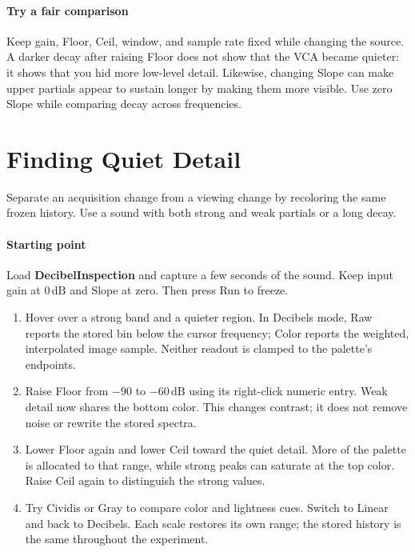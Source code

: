 \paragraph{Try a fair comparison}
Keep gain, Floor, Ceil, window, and sample rate fixed while changing the
source. A darker decay after raising Floor does not show that the VCA became
quieter: it shows that you hid more low-level detail. Likewise, changing
Slope can make upper partials appear to sustain longer by making them more
visible. Use zero Slope while comparing decay across frequencies.

\clearpage
\section{Finding Quiet Detail}\label{sec:detail}

Separate an acquisition change from a viewing change by recoloring the same
frozen history. Use a sound with both strong and weak partials or a long decay.

\paragraph{Starting point}
Load \textbf{DecibelInspection} and capture a few seconds of the sound.
Keep input gain at $0\,\mathrm{dB}$ and Slope at zero. Then press Run to freeze.

\begin{enumerate}
  \item Hover over a strong band and a quieter region. In Decibels mode,
  Raw reports the stored bin below the cursor frequency; Color reports the
  weighted, interpolated image sample. Neither readout is clamped to the
  palette's endpoints.
  \item Raise Floor from $-90$ to $-60\,\mathrm{dB}$ using its right-click
  numeric entry. Weak detail now shares the bottom color. This changes
  contrast; it does not remove noise or rewrite the stored spectra.
  \item Lower Floor again and lower Ceil toward the quiet detail. More of
  the palette is allocated to that range, while strong peaks can saturate at
  the top color. Raise Ceil again to distinguish the strong values.
  \item Try Cividis or Gray to compare color and lightness cues. Switch to
  Linear and back to Decibels. Each scale restores its own range; the stored
  history is the same throughout the experiment.
\end{enumerate}

